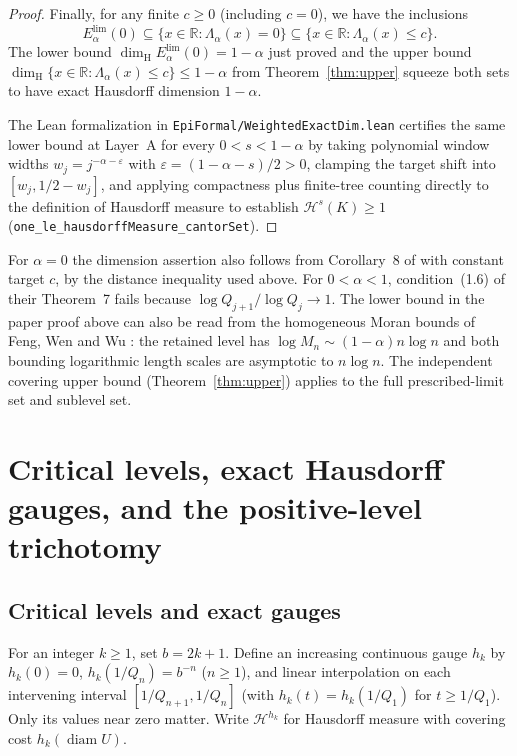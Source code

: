 \documentclass[11pt]{article}
\theoremstyle{definition}
\theoremstyle{remark}
\newcommand{\R}{\mathbb{R}}
\newcommand{\dimH}{\dim_{\mathrm{H}}}
\newcommand{\Lam}{\Lambda}
\begin{document}
\begin{proof}
Finally, for any finite $c\ge0$ (including $c=0$), we have the inclusions
\[
E_{\alpha}^{\mathrm{lim}}(0)
\subseteq\{x\in\R:\Lam_\alpha(x)=0\}
\subseteq\{x\in\R:\Lam_\alpha(x)\le c\}.
\]
The lower bound $\dimH E_{\alpha}^{\mathrm{lim}}(0)=1-\alpha$ just proved and
the upper bound $\dimH\{x\in\R:\Lam_\alpha(x)\le c\}\le1-\alpha$ from
Theorem~\ref{thm:upper} squeeze both sets to have exact Hausdorff dimension
$1-\alpha$.

The Lean formalization in \texttt{EpiFormal/\allowbreak WeightedExactDim.lean}
certifies the same lower bound at Layer~A for every $0<s<1-\alpha$ by taking
polynomial window widths $w_j=j^{-\alpha-\varepsilon}$ with
$\varepsilon=(1-\alpha-s)/2>0$, clamping the target shift into
$[w_j,1/2-w_j]$, and applying compactness plus finite-tree counting directly to
the definition of Hausdorff measure to establish
$\mathcal H^s(K)\ge1$ (\texttt{one\_le\_hausdorffMeasure\_cantorSet}).
\end{proof}

For $\alpha=0$ the dimension assertion also follows from Corollary~8 of
\cite{BLR} with constant target $c$, by the distance inequality used
above. For $0<\alpha<1$, condition~(1.6) of their Theorem~7 fails because
$\log Q_{j+1}/\log Q_j\to1$. The lower bound in the paper proof above can also
be read from the homogeneous Moran bounds of Feng, Wen and Wu \cite{FWW}: the
retained level has $\log M_n\sim(1-\alpha)n\log n$ and both bounding logarithmic
length scales are asymptotic to $n\log n$. The independent covering upper bound
(Theorem~\ref{thm:upper}) applies to the full prescribed-limit set and sublevel
set.

\section{Critical levels, exact Hausdorff gauges, and the positive-level trichotomy}\label{sec:gauge}

\subsection{Critical levels and exact gauges}

For an integer $k\ge1$, set $b=2k+1$. Define an increasing continuous
gauge $h_k$ by $h_k(0)=0$, $h_k(1/Q_n)=b^{-n}$ ($n\ge1$), and
linear interpolation on each intervening interval $[1/Q_{n+1},1/Q_n]$ (with
$h_k(t)=h_k(1/Q_1)$ for $t\ge1/Q_1$). Only its values near zero matter. Write
$\mathcal H^{h_k}$ for Hausdorff measure with covering cost
$h_k(\operatorname{diam} U)$.
\end{document}

